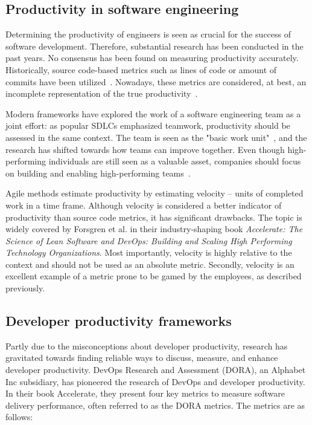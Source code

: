 \subsection{Productivity in software engineering}
Determining the productivity of engineers is seen as crucial for the success of software development. Therefore, substantial research has been conducted in the past years.\cite{oliveira_code_2020} No consensus has been found on measuring productivity accurately. Historically, source code-based metrics such as lines of code or amount of commits have been utilized~\cite{oliveira_code_2020}. Nowadays, these metrics are considered, at best, an incomplete representation of the true productivity~\cite{forsgren_space_2021}.

Modern frameworks have explored the work of a software engineering team as a joint effort: as popular SDLCs emphasized teamwork, productivity should be assessed in the same context. The team is seen as the "basic work unit"~\cite{moe_overcoming_2010}, and the research has shifted towards how teams can improve together. Even though high-performing individuals are still seen as a valuable asset, companies should focus on building and enabling high-performing teams~\cite{forsgren_space_2021}. 

Agile methods estimate productivity by estimating velocity – units of completed work in a time frame. Although velocity is considered a better indicator of productivity than source code metrics, it has significant drawbacks. The topic is widely covered by Forsgren et al. in their industry-shaping book \textit{Accelerate: The Science of Lean Software and DevOps: Building and Scaling High Performing Technology Organizations}. Most importantly, velocity is highly relative to the context and should not be used as an absolute metric. Secondly, velocity is an excellent example of a metric prone to be gamed by the employees, as described previously.~\cite{forsgren_accelerate_2018}
 
\subsection{Developer productivity frameworks}

Partly due to the misconceptions about developer productivity, research has gravitated towards finding reliable ways to discuss, measure, and enhance developer productivity. DevOps Research and Assessment (DORA), an Alphabet Inc subsidiary, has pioneered the research of DevOps and developer productivity. In their book Accelerate, they present four key metrics to measure software delivery performance, often referred to as the DORA metrics. The metrics are as follows: 

